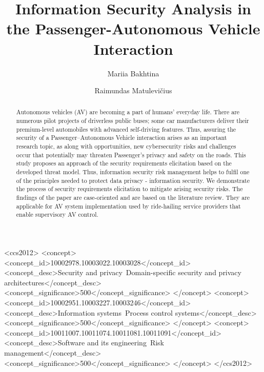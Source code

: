 \documentclass[manuscript]{acmart}
\begin{document}
\title[Information Security Analysis in the Passenger-AV Interaction]{Information Security Analysis in the Passenger-Autonomous Vehicle Interaction}

\author{Mariia Bakhtina}
\author{Raimundas Matulevi{\v{c}}ius}
  


\begin{abstract}
  Autonomous vehicles (AV) are becoming a part of humans' everyday life. There are numerous pilot projects of driverless public buses; some car manufacturers deliver their premium-level automobiles with advanced self-driving features. Thus, assuring the security of a Passenger--Autonomous Vehicle interaction arises as an important research topic, as along with opportunities, new cybersecurity risks and challenges occur that potentially may threaten Passenger's privacy and safety on the roads. This study proposes an approach of the security requirements elicitation based on the developed threat model. Thus, information security risk management helps to fulfil one of the principles needed to protect data privacy - information security. We demonstrate the process of security requirements elicitation to mitigate arising security risks. The findings of the paper are case-oriented and are based on the literature review. They are applicable for AV system implementation used by ride-hailing service providers that enable supervisory AV control.
\end{abstract}

\begin{CCSXML}
<ccs2012>
   <concept>
       <concept_id>10002978.10003022.10003028</concept_id>
       <concept_desc>Security and privacy~Domain-specific security and privacy architectures</concept_desc>
       <concept_significance>500</concept_significance>
       </concept>
    <concept>
       <concept_id>10002951.10003227.10003246</concept_id>
       <concept_desc>Information systems~Process control systems</concept_desc>
       <concept_significance>500</concept_significance>
       </concept>
    <concept>
        <concept_id>10011007.10011074.10011081.10011091</concept_id>
        <concept_desc>Software and its engineering~Risk management</concept_desc>
        <concept_significance>500</concept_significance>
        </concept>
 </ccs2012>
\end{CCSXML}
\end{document}
